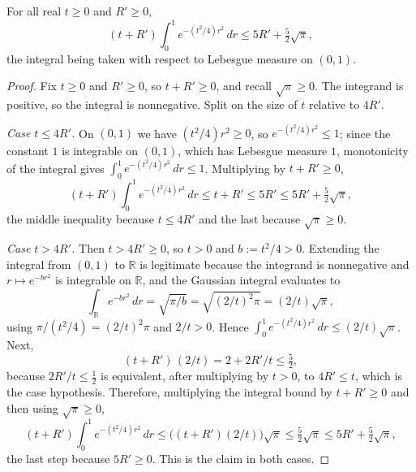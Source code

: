 \begin{lemma}
For all real $t \geq 0$ and $R' \geq 0$,
\[
  (t + R')\int_0^1 e^{-(t^2/4)r^2}\,dr \leq 5R' + \tfrac52\sqrt\pi ,
\]
the integral being taken with respect to Lebesgue measure on $(0,1)$.
\end{lemma}
\begin{proof}
Fix $t \geq 0$ and $R' \geq 0$, so $t + R' \geq 0$, and recall $\sqrt\pi \geq 0$.
The integrand is positive, so the integral is nonnegative.  Split on the size of
$t$ relative to $4R'$.

\emph{Case $t \leq 4R'$.}
On $(0,1)$ we have $(t^2/4)r^2 \geq 0$, so $e^{-(t^2/4)r^2} \leq 1$; since the
constant $1$ is integrable on $(0,1)$, which has Lebesgue measure $1$,
monotonicity of the integral gives $\int_0^1 e^{-(t^2/4)r^2}\,dr \leq 1$.
Multiplying by $t + R' \geq 0$,
\[
  (t+R')\int_0^1 e^{-(t^2/4)r^2}\,dr \leq t + R' \leq 5R'
    \leq 5R' + \tfrac52\sqrt\pi ,
\]
the middle inequality because $t \leq 4R'$ and the last because
$\sqrt\pi \geq 0$.

\emph{Case $t > 4R'$.}
Then $t > 4R' \geq 0$, so $t > 0$ and $b := t^2/4 > 0$.  Extending the integral
from $(0,1)$ to $\mathbb{R}$ is legitimate because the integrand is nonnegative
and $r \mapsto e^{-br^2}$ is integrable on $\mathbb{R}$, and the Gaussian
integral evaluates to
\[
  \int_{\mathbb{R}} e^{-br^2}\,dr = \sqrt{\pi/b} = \sqrt{(2/t)^2\pi}
    = (2/t)\sqrt\pi ,
\]
using $\pi/(t^2/4) = (2/t)^2\pi$ and $2/t > 0$.  Hence
$\int_0^1 e^{-(t^2/4)r^2}\,dr \leq (2/t)\sqrt\pi$.  Next,
\[
  (t+R')\,(2/t) = 2 + 2R'/t \leq \tfrac52 ,
\]
because $2R'/t \leq \tfrac12$ is equivalent, after multiplying by $t > 0$, to
$4R' \leq t$, which is the case hypothesis.  Therefore, multiplying the integral
bound by $t + R' \geq 0$ and then using $\sqrt\pi \geq 0$,
\[
  (t+R')\int_0^1 e^{-(t^2/4)r^2}\,dr
    \leq \bigl((t+R')(2/t)\bigr)\sqrt\pi \leq \tfrac52\sqrt\pi
    \leq 5R' + \tfrac52\sqrt\pi ,
\]
the last step because $5R' \geq 0$.  This is the claim in both cases.
\end{proof}
